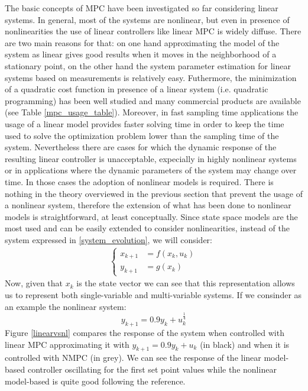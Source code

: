The basic concepts of MPC have been investigated so far considering linear systems. In general, most of the systems are nonlinear, but even in presence of nonlinearities the use of linear controllers like linear MPC is widely diffuse. There are two main reasons for that: on one hand approximating the model of the system as linear gives good results when it moves in the neighborhood of a stationary point, on the other hand the system parameter estimation for linear systems based on measurements is relatively easy. Futhermore, the minimization of a quadratic cost function in presence of a linear system (i.e. quadratic programming) has been well studied and many commercial products are available (see Table \ref{mpc_usage_table}). Moreover, in fast sampling time applications the usage of a linear model provides faster solving time in order to keep the time used to solve the optimization problem lower than the sampling time of the system.
Nevertheless there are cases for which the dynamic response of the resulting linear controller is unacceptable, expecially in highly nonlinear systems or in applications where the dynamic parameters of the system may change over time. In those cases the adoption of nonlinear models is required. 
There is nothing in the theory overviewed in the previous section that prevent the usage of a nonlinear system, therefore the extension of what has been done to nonlinear models is straightforward, at least conceptually. Since state space models are the most used and can be easily extended to consider nonlinearities, instead of the system expressed in \eqref{system_evolution}, we will consider:
\begin{equation}
\begin{split}
\begin{cases}
x_{k+1}&=f(x_k,u_k) \\
y_{k+1}&=g(x_k)
\end{cases}
\end{split}
\end{equation} 
Now, given that $x_k$ is the state vector we can see that this representation allows us to represent both single-variable and multi-variable systems. If we consinder as an example the nonlinear system:
\begin{equation}
y_{k+1}=0.9y_k+u_k^{\frac{1}{4}}
\end{equation}
Figure \ref{linearvsnl} compares the response of the system when controlled with linear MPC approximating it with $y_{k+1} = 0.9y_k+u_k$ (in black) and when it is controlled with NMPC (in grey). We can see the response of the linear model-based controller oscillating for the first set point values while the nonlinear model-based is quite good following the reference. 
